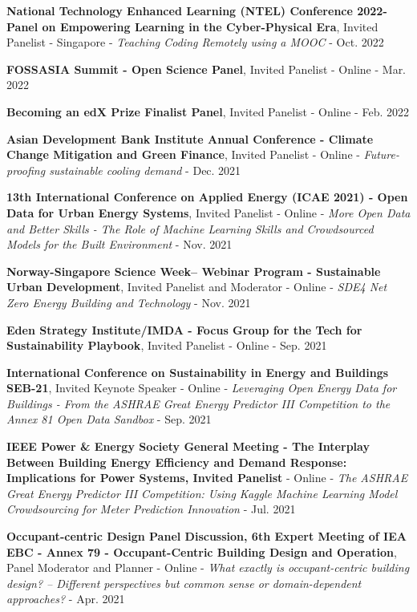 \documentclass[10pt,a4paper]{article}
\begin{document}
\begin{small}
\begin{etaremune}
\item
\textbf{National Technology Enhanced Learning (NTEL) Conference 2022- Panel on Empowering Learning in the Cyber-Physical Era}, Invited Panelist - Singapore - \emph{Teaching Coding Remotely using a MOOC} - Oct. 2022
\item
\textbf{FOSSASIA Summit - Open Science Panel}, Invited Panelist - Online - Mar. 2022
\item
\textbf{Becoming an edX Prize Finalist Panel}, Invited Panelist - Online - Feb. 2022
\item
\textbf{Asian Development Bank Institute Annual Conference - Climate Change Mitigation and Green Finance}, Invited Panelist - Online - \emph{Future-proofing sustainable cooling demand} - Dec. 2021
\item
\textbf{13th International Conference on Applied Energy (ICAE 2021) - Open Data for Urban Energy Systems}, Invited Panelist - Online - \emph{More Open Data and Better Skills - The Role of Machine Learning Skills and Crowdsourced Models for the Built Environment} - Nov. 2021
\item
\textbf{Norway-Singapore Science Week– Webinar Program - Sustainable Urban Development}, Invited Panelist and Moderator - Online - \emph{SDE4 Net Zero Energy Building and Technology} - Nov. 2021
\item
\textbf{Eden Strategy Institute/IMDA - Focus Group for the Tech for Sustainability Playbook}, Invited Panelist - Online - Sep. 2021
\item
\textbf{International Conference on Sustainability in Energy and Buildings SEB-21}, Invited Keynote Speaker - Online - \emph{Leveraging Open Energy Data for Buildings - From the ASHRAE Great Energy Predictor III Competition to the Annex 81 Open Data Sandbox} - Sep. 2021
\item
\textbf{IEEE Power \& Energy Society General Meeting - The Interplay Between Building Energy Efficiency and Demand Response: Implications for Power Systems, Invited Panelist} - Online - \emph{The ASHRAE Great Energy Predictor III Competition: Using Kaggle Machine Learning Model Crowdsourcing for Meter Prediction Innovation} - Jul. 2021
\item
\textbf{Occupant-centric Design Panel Discussion, 6th Expert Meeting of IEA EBC - Annex 79 - Occupant-Centric Building Design and Operation}, Panel Moderator and Planner - Online - \emph{What exactly is occupant-centric building design? – Different perspectives but common sense or domain-dependent approaches?}  - Apr. 2021
\item

\end{etaremune}
\end{small}
\end{document}

